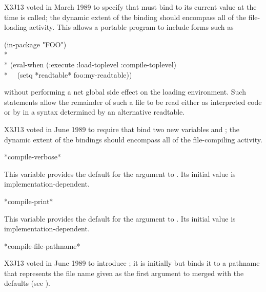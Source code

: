 \begin{newer}
X3J13 voted in March 1989 
to specify that  must bind  to its current value
at the time  is called; the dynamic extent of the binding
should encompass all of the file-loading activity.
This allows a portable program to include forms such as
\begin{lisp}
(in-package "FOO") \\*
\\*
(eval-when (:execute :load-toplevel :compile-toplevel) \\*
~~(setq *readtable* foo:my-readtable))
\end{lisp}
without performing a net global side effect on the loading environment.
Such statements allow the remainder of such a file to be read either as
interpreted code or by  in a syntax determined by
an alternative readtable.
\end{newer}

\begin{newer}
X3J13 voted in June 1989 
to require that  bind two new variables
 and ; the dynamic extent of the bindings
should encompass all of the file-compiling activity.
\end{newer}

\begin{defun}[Variable]
*compile-verbose*

This variable provides the default for the  argument
to .  Its initial value is implementation-dependent.
\end{defun}

\begin{defun}[Variable]
*compile-print*

This variable provides the default for the  argument
to .  Its initial value is implementation-dependent.
\end{defun}

\begin{defun}[Variable]
*compile-file-pathname*

X3J13 voted in June 1989  to introduce ;
it is initially  but  binds it to a pathname that
represents the file name given as the first argument to  merged
with the defaults (see ).
\end{defun}

